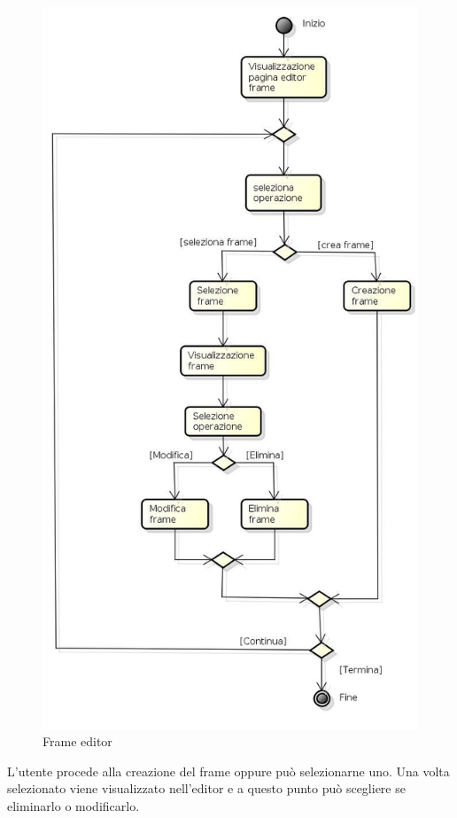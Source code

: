 \begin{figure}[h!]
		\centering
		\includegraphics[scale=.5]{img/Editor_frame.jpg}
		\caption{Frame editor}
		\label{fig:Frame_editor}
\end{figure}

L'utente procede alla creazione del frame oppure può selezionarne uno. Una volta selezionato viene visualizzato nell'editor e a questo punto può scegliere se eliminarlo o modificarlo.

